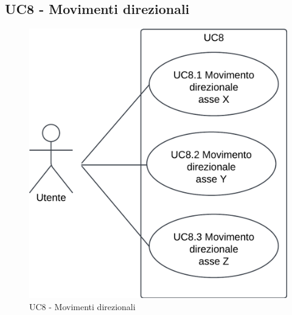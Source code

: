 \subsection{UC8 - Movimenti direzionali}
\begin{figure}[h!]\centering
    \includegraphics[scale=0.7]{template/images/UC8.png}
    \caption{UC8 - Movimenti direzionali}
\end{figure}
